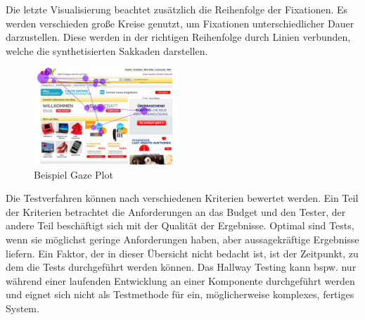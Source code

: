 Die letzte Visualisierung beachtet zusätzlich die Reihenfolge der Fixationen. Es werden verschieden große Kreise genutzt, um Fixationen unterschiedlicher Dauer darzustellen. Diese werden in der richtigen Reihenfolge durch Linien verbunden, welche die synthetisierten Sakkaden darstellen.
\begin{figure}[H]
 \centering
 \includegraphics[width=0.48\textwidth]{grafiken/gaze_plot.png}
 \caption{Beispiel Gaze Plot \cite{Henrici2010}}
 \label{fig:gazePlot}
\end{figure}
Die Testverfahren können nach verschiedenen Kriterien bewertet werden. Ein Teil der Kriterien betrachtet die Anforderungen an das Budget und den Tester, der andere Teil beschäftigt sich mit der Qualität der Ergebnisse. Optimal sind Tests, wenn sie möglichst geringe Anforderungen haben, aber aussagekräftige Ergebnisse liefern. Ein Faktor, der in dieser Übersicht nicht bedacht ist, ist der Zeitpunkt, zu dem die Tests durchgeführt werden können. Das Hallway Testing kann bspw. nur während einer laufenden Entwicklung an einer Komponente durchgeführt werden und eignet sich nicht als Testmethode für ein, möglicherweise komplexes, fertiges System.

